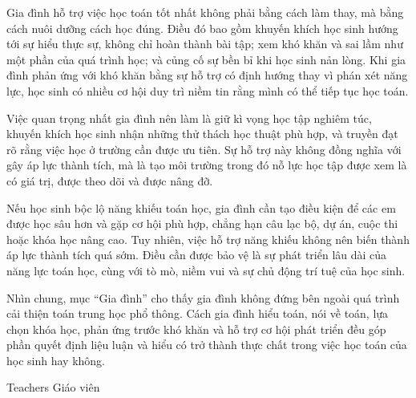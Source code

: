 {{    Gia đình hỗ trợ việc học toán tốt nhất không phải bằng cách làm thay, mà bằng cách nuôi dưỡng cách học đúng. Điều đó bao gồm khuyến khích học sinh hướng tới sự hiểu thực sự, không chỉ hoàn thành bài tập; xem khó khăn và sai lầm như một phần của quá trình học; và củng cố sự bền bỉ khi học sinh nản lòng. Khi gia đình phản ứng với khó khăn bằng sự hỗ trợ có định hướng thay vì phán xét năng lực, học sinh có nhiều cơ hội duy trì niềm tin rằng mình có thể tiếp tục học toán.

    Việc quan trọng nhất gia đình nên làm là giữ kì vọng học tập nghiêm túc, khuyến khích học sinh nhận những thử thách học thuật phù hợp, và truyền đạt rõ rằng việc học ở trường cần được ưu tiên. Sự hỗ trợ này không đồng nghĩa với gây áp lực thành tích, mà là tạo môi trường trong đó nỗ lực học tập được xem là có giá trị, được theo dõi và được nâng đỡ.

    Nếu học sinh bộc lộ năng khiếu toán học, gia đình cần tạo điều kiện để các em được học sâu hơn và gặp cơ hội phù hợp, chẳng hạn câu lạc bộ, dự án, cuộc thi hoặc khóa học nâng cao. Tuy nhiên, việc hỗ trợ năng khiếu không nên biến thành áp lực thành tích quá sớm. Điều cần được bảo vệ là sự phát triển lâu dài của năng lực toán học, cùng với tò mò, niềm vui và sự chủ động trí tuệ của học sinh.

    Nhìn chung, mục ``Gia đình'' cho thấy gia đình không đứng bên ngoài quá trình cải thiện toán trung học phổ thông. Cách gia đình hiểu toán, nói về toán, lựa chọn khóa học, phản ứng trước khó khăn và hỗ trợ cơ hội phát triển đều góp phần quyết định liệu luận và hiểu có trở thành thực chất trong việc học toán của học sinh hay không.}
  }

\ParallelSection
  {Teachers}
  {Giáo viên}
  {}

